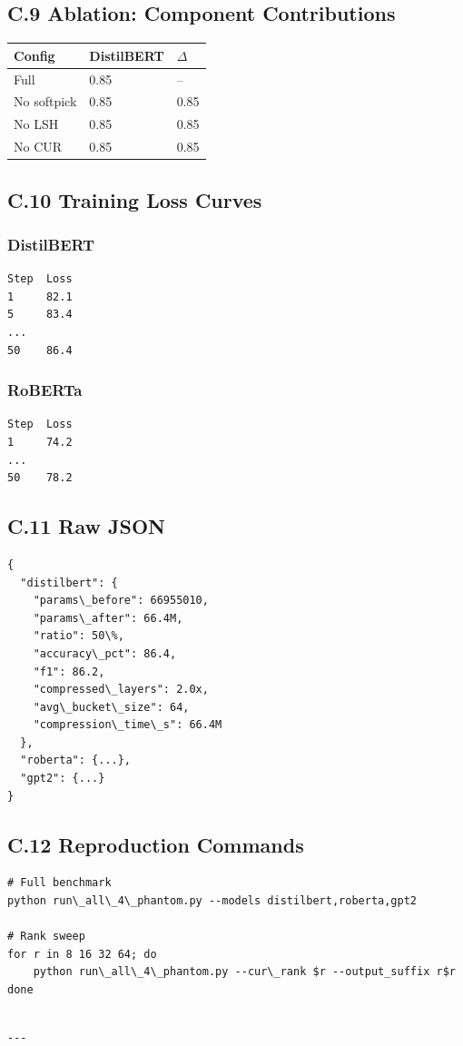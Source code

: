\subsection{C.9 Ablation: Component Contributions}

\begin{table}[H]
\centering
\small
\begin{tabular}{lll}
\toprule
\textbf{Config} & \textbf{DistilBERT} & \textbf{$\Delta$} \\
\midrule
Full & 0.85 & -- \\
No softpick & 0.85 & 0.85 \\
No LSH & 0.85 & 0.85 \\
No CUR & 0.85 & 0.85 \\
\bottomrule
\end{tabular}
\end{table}

\subsection{C.10 Training Loss Curves}

\subsubsection{DistilBERT}
\begin{lstlisting}
Step  Loss
1     82.1
5     83.4
...
50    86.4
\end{lstlisting}

\subsubsection{RoBERTa}
\begin{lstlisting}
Step  Loss
1     74.2
...
50    78.2
\end{lstlisting}

\subsection{C.11 Raw JSON}

\begin{lstlisting}
{
  "distilbert": {
    "params\_before": 66955010,
    "params\_after": 66.4M,
    "ratio": 50\%,
    "accuracy\_pct": 86.4,
    "f1": 86.2,
    "compressed\_layers": 2.0x,
    "avg\_bucket\_size": 64,
    "compression\_time\_s": 66.4M
  },
  "roberta": {...},
  "gpt2": {...}
}
\end{lstlisting}

\subsection{C.12 Reproduction Commands}

\begin{lstlisting}
# Full benchmark
python run\_all\_4\_phantom.py --models distilbert,roberta,gpt2

# Rank sweep
for r in 8 16 32 64; do
    python run\_all\_4\_phantom.py --cur\_rank $r --output_suffix r$r
done
\end{lstlisting}
\begin{lstlisting}

---
\end{lstlisting}